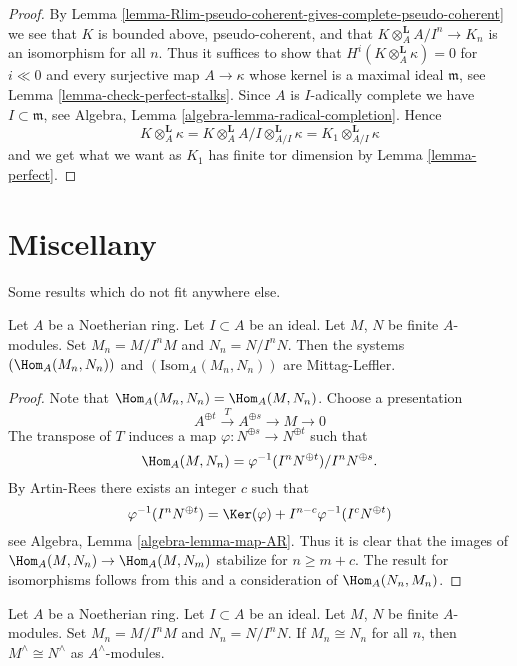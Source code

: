 \begin{proof}
By Lemma \ref{lemma-Rlim-pseudo-coherent-gives-complete-pseudo-coherent}
we see that $K$ is bounded above, pseudo-coherent, and that
$K \otimes_A^\mathbf{L} A/I^n \to K_n$ is an isomorphism for all $n$.
Thus it suffices to show that $H^i(K \otimes_A^\mathbf{L} \kappa) = 0$ for
$i \ll 0$ and every surjective map $A \to \kappa$ whose kernel is
a maximal ideal $\mathfrak m$, see
Lemma \ref{lemma-check-perfect-stalks}.
Since $A$ is $I$-adically complete we have $I \subset \mathfrak m$, see
Algebra, Lemma \ref{algebra-lemma-radical-completion}.
Hence
$$
K \otimes_A^\mathbf{L} \kappa =
K \otimes_A^\mathbf{L} A/I \otimes_{A/I}^\mathbf{L} \kappa =
K_1 \otimes_{A/I}^\mathbf{L} \kappa
$$
and we get what we want as $K_1$ has finite tor dimension by
Lemma \ref{lemma-perfect}.
\end{proof}






\section{Miscellany}
\label{section-misc}

\noindent
Some results which do not fit anywhere else.

\begin{lemma}
\label{lemma-hom-systems-ML}
Let $A$ be a Noetherian ring. Let $I \subset A$ be an ideal. Let $M$, $N$ be
finite $A$-modules. Set $M_n = M/I^nM$ and $N_n = N/I^nN$. Then
the systems $(\Hom_A(M_n, N_n))$ and $(\text{Isom}_A(M_n, N_n))$
are Mittag-Leffler.
\end{lemma}

\begin{proof}
Note that $\Hom_A(M_n, N_n) = \Hom_A(M, N_n)$. Choose a presentation
$$
A^{\oplus t} \xrightarrow{T} A^{\oplus s} \to M \to 0
$$
The transpose of $T$ induces a map $\varphi : N^{\oplus s} \to N^{\oplus t}$
such that
$$
\Hom_A(M, N_n) = \varphi^{-1}(I^nN^{\oplus t})/I^nN^{\oplus s}.
$$
By Artin-Rees there exists an integer $c$ such that
$$
\varphi^{-1}(I^nN^{\oplus t}) =
\Ker(\varphi) + I^{n - c}\varphi^{-1}(I^cN^{\oplus t})
$$
see Algebra, Lemma \ref{algebra-lemma-map-AR}. Thus it is clear that
the images of $\Hom_A(M, N_n) \to \Hom_A(M, N_m)$ stabilize for
$n \geq m + c$. The result for isomorphisms follows from this
and a consideration of $\Hom_A(N_n, M_n)$.
\end{proof}

\begin{lemma}
\label{lemma-isomorphic-completions}
Let $A$ be a Noetherian ring. Let $I \subset A$ be an ideal. Let $M$, $N$ be
finite $A$-modules. Set $M_n = M/I^nM$ and $N_n = N/I^nN$. If
$M_n \cong N_n$ for all $n$, then $M^\wedge \cong N^\wedge$
as $A^\wedge$-modules.
\end{lemma}

